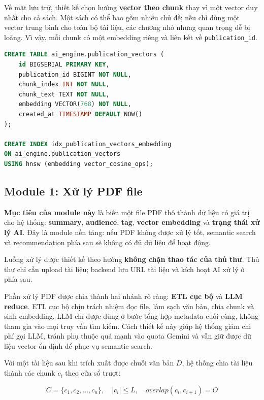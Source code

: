 Về mặt lưu trữ, thiết kế chọn hướng \textbf{vector theo chunk} thay vì một vector
duy nhất cho cả sách. Một sách có thể bao gồm nhiều chủ đề; nếu chỉ dùng một
vector trung bình cho toàn bộ tài liệu, các chương nhỏ nhưng quan trọng dễ bị
loãng. Vì vậy, mỗi chunk có một embedding riêng và liên kết về
\texttt{publication\_id}.

\begin{lstlisting}[language=SQL, caption={Thiết kế bảng vector phục vụ semantic search}, label={lst:ai_vector_schema_design}]
CREATE TABLE ai_engine.publication_vectors (
    id BIGSERIAL PRIMARY KEY,
    publication_id BIGINT NOT NULL,
    chunk_index INT NOT NULL,
    chunk_text TEXT NOT NULL,
    embedding VECTOR(768) NOT NULL,
    created_at TIMESTAMP DEFAULT NOW()
);

CREATE INDEX idx_publication_vectors_embedding
ON ai_engine.publication_vectors
USING hnsw (embedding vector_cosine_ops);
\end{lstlisting}

\FloatBarrier

\subsection{Module 1: Xử lý PDF file}

\textbf{Mục tiêu của module này} là biến một file PDF thô thành dữ liệu có giá trị cho hệ thống: \textbf{summary}, \textbf{audience}, \textbf{tag}, \textbf{vector embedding} và \textbf{trạng thái xử lý AI}. Đây là module nền tảng: nếu PDF không được xử lý tốt, semantic search và recommendation phía sau sẽ không có đủ dữ liệu để hoạt động.

Luồng xử lý được thiết kế theo hướng \textbf{không chặn thao tác của thủ thư}. Thủ thư chỉ cần upload tài liệu; backend lưu URL tài liệu và kích hoạt AI xử lý ở phía sau.

Phần xử lý PDF được chia thành hai nhánh rõ ràng: \textbf{ETL cục bộ} và
\textbf{LLM reduce}. ETL cục bộ chịu trách nhiệm đọc file, làm sạch văn bản,
chia chunk và sinh embedding. LLM chỉ được dùng ở bước tổng hợp metadata cuối
cùng, không tham gia vào mọi truy vấn tìm kiếm. Cách thiết kế này giúp hệ thống
giảm chi phí gọi LLM, tránh phụ thuộc quá mạnh vào quota Gemini và vẫn giữ được
dữ liệu vector ổn định để phục vụ semantic search.

Với một tài liệu sau khi trích xuất được chuỗi văn bản $D$, hệ thống chia tài
liệu thành các chunk $c_i$ theo cửa sổ trượt:

\[
C = \{c_1, c_2, ..., c_n\}, \quad |c_i| \leq L,\quad overlap(c_i,c_{i+1}) = O
\]

